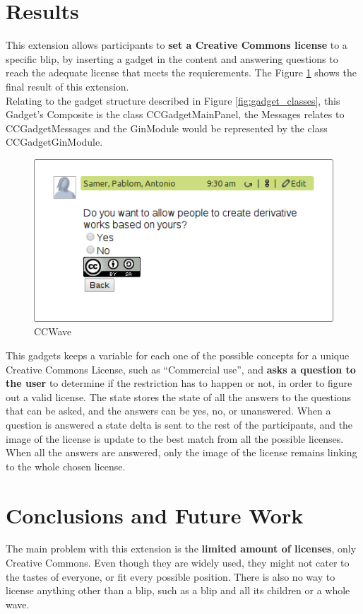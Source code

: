 \section{Results}
This extension allows participants to \textbf{set a Creative Commons license} to a specific blip, by inserting a gadget in the content and answering questions to reach the adequate license that meets the requierements. The Figure \ref{fig:cc_gadget} shows the final result of this extension.\\[.2cm]
Relating to the gadget structure described in Figure \ref{fig:gadget_classes}, this Gadget's Composite is the class CCGadgetMainPanel, the Messages relates to CCGadgetMessages and the GinModule would be represented by the class CCGadgetGinModule.
\begin{figure}[H]
  \center
    \includegraphics[keepaspectratio, scale=0.7]{Media/Captures/Extensions/CCGadget.png}
  \caption{CCWave}
  \label{fig:cc_gadget}
\end{figure}
This gadgets keeps a variable for each one of the possible concepts for a unique Creative Commons License, such as ``Commercial use'', and \textbf{asks a question to the user} to determine if the restriction has to happen or not, in order to figure out a valid license. The state stores the state of all the answers to the questions that can be asked, and the answers can be yes, no, or unanswered. When a question is answered a state delta is sent to the rest of the participants, and the image of the license is update to the best match from all the possible licenses. When all the answers are answered, only the image of the license remains linking to the whole chosen license.\\[.2cm]
\section{Conclusions and Future Work}
The main problem with this extension is the \textbf{limited amount of licenses}, only Creative Commons. Even though they are widely used, they might not cater to the tastes of everyone, or fit every possible position. There is also no way to license anything other than a blip, such as a blip and all its children or a whole wave.
\newpage
